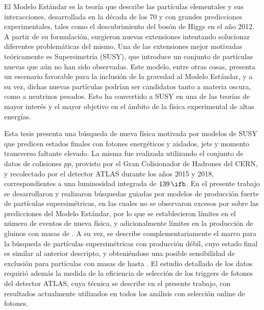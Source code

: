 

El Modelo Estándar es la teoría que describe las partículas elementales y sus interacciones, desarrollada en la década de los 70 y con grandes predicciones experimentales, tales como el descubrimiento del bosón de Higgs en el año 2012. A partir de su formulación, surgieron nuevas extensiones intentando solucionar diferentes problemáticas del mismo. Una de las extensiones mejor motivadas teóricamente es Supersimetría (SUSY), que introduce un conjunto de partículas nuevas que aún no han sido observadas. Este modelo, entre otras cosas, presenta un escenario favorable para la inclusión de la gravedad al Modelo Estándar, y a su vez, dichas nuevas partículas podrían ser candidatos tanto a materia oscura, como a neutrinos pesados. Esto ha convertido a SUSY en una de las teorías de mayor interés y el mayor objetivo en el ámbito de la física experimental de altas energías.

Esta tesis presenta una búsqueda de nueva física motivada por modelos de SUSY que predicen estados finales con fotones energéticos y aislados, jets y momento transverso faltante elevado. La misma fue realizada utilizando el conjunto de datos de colisiones $pp$, provisto por el Gran Colisionador de Hadrones del CERN, y recolectado por el detector ATLAS durante los años 2015 y 2018, correspondientes a una luminosidad integrada de $139\,\ifb$. En el presente trabajo se desarrollaron y realizaron búsquedas guiadas por modelos de producción fuerte de partículas supersimétricas, en las cuales no se observaron excesos por sobre las predicciones del Modelo Estándar, por lo que se establecieron límites en el número de eventos de nueva física, y adicionalmente límites en la producción de gluinos con masas de . A su vez, se describe complementariamente el marco para la búsqueda de partículas supersimétricas con producción débil, cuyo estado final es similar al anterior descripto, y obteniéndose una posible sensibilidad de exclusión para partículas con masas de hasta .
El estudio detallado de los datos requirió además la medida de la eficiencia de selección de los triggers de fotones del detector ATLAS, cuya técnica se describe en el presente trabajo, con resultados actualmente utilizados en todos los análisis con selección online de fotones.


